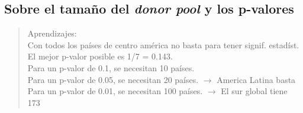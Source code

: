 \documentclass[11pt]{article}
\begin{document}
\subsection*{Sobre el tama\~no del \emph{donor pool} y los p-valores}
\begin{quote}
\noindent Aprendizajes: \\
Con todos los países de centro américa no basta para tener signif. estadíst. \\
El mejor p-valor posible es 1/7 = 0.143. \\
Para un p-valor de 0.1, se necesitan 10 países. \\
Para un p-valor de 0.05, se necesitan 20 países. $\to$ America Latina basta \\
Para un p-valor de 0.01, se necesitan 100 países. $\to$ El sur global tiene 173
\end{quote}
\end{document}
